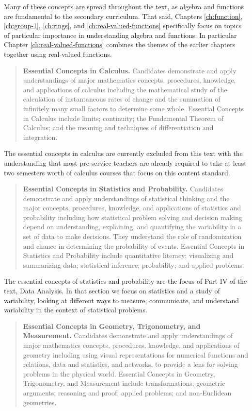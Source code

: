 \documentclass[
]{book}
\theoremstyle{definition}
\theoremstyle{definition}
\theoremstyle{definition}
\theoremstyle{definition}
\theoremstyle{remark}
\begin{document}
Many of these concepts are spread throughout the text, as algebra and functions are fundamental to the secondary curriculum. That said, Chapters \ref{ch:function}, \ref{ch:group-1}, \ref{ch:rings}, and \ref{ch:real-valued-functions} specifically focus on topics of particular importance in understanding algebra and functions. In particular Chapter \ref{ch:real-valued-functions} combines the themes of the earlier chapters together using real-valued functions.

\begin{quote}
\textbf{Essential Concepts in Calculus.} Candidates demonstrate and apply understandings of major mathematics concepts, procedures, knowledge, and applications of calculus including the mathematical study of the calculation of instantaneous rates of change and the summation of infinitely many small factors to determine some whole. Essential Concepts in Calculus include limits; continuity; the Fundamental Theorem of Calculus; and the meaning and techniques of differentiation and integration.
\end{quote}

The essential concepts in calculus are currently excluded from this text with the understanding that most pre-service teachers are already required to take at least two semesters worth of calculus courses that focus on this content standard.

\begin{quote}
\textbf{Essential Concepts in Statistics and Probability.} Candidates demonstrate and apply understandings of statistical thinking and the major concepts, procedures, knowledge, and applications of statistics and probability including how statistical problem solving and decision making depend on understanding, explaining, and quantifying the variability in a set of data to make decisions. They understand the role of randomization and chance in determining the probability of events. Essential Concepts in Statistics and Probability include quantitative literacy; visualizing and summarizing data; statistical inference; probability; and applied problems.
\end{quote}

The essential concepts of statistics and probability are the focus of Part IV of the text, Data Analysis. In that section we focus on statistics and a study of variability, looking at different ways to measure, communicate, and understand variability in the context of statistical problems.

\begin{quote}
\textbf{Essential Concepts in Geometry, Trigonometry, and Measurement.} Candidates demonstrate and apply understandings of major mathematics concepts, procedures, knowledge, and applications of geometry including using visual representations for numerical functions and relations, data and statistics, and networks, to provide a lens for solving problems in the physical world. Essential Concepts in Geometry, Trigonometry, and Measurement include transformations; geometric arguments; reasoning and proof; applied problems; and non-Euclidean geometries.
\end{quote}
\end{document}
